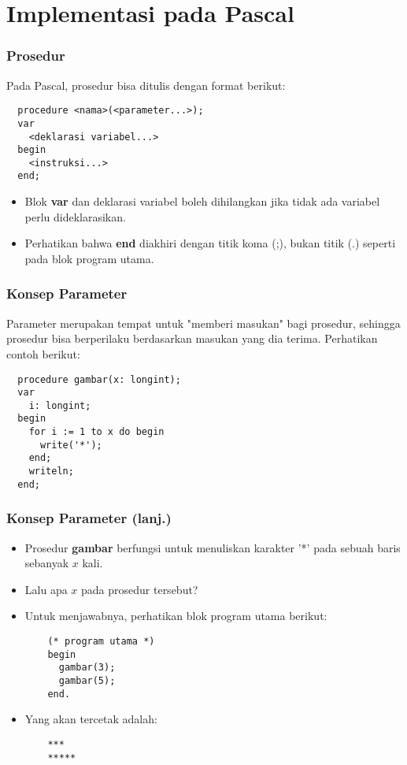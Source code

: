 \section{Implementasi pada Pascal}
\frame{\sectionpage}

\begin{frame}[fragile]
\frametitle{Prosedur}
Pada Pascal, prosedur bisa ditulis dengan format berikut:
\begin{lstlisting}
  procedure <nama>(<parameter...>);
  var
    <deklarasi variabel...>
  begin
    <instruksi...>
  end;
\end{lstlisting}
\begin{itemize}
  \item Blok \textbf{var} dan deklarasi variabel boleh dihilangkan jika tidak ada variabel perlu dideklarasikan.
  \item Perhatikan bahwa \textbf{end} diakhiri dengan titik koma (;), bukan titik (.) seperti pada blok program utama.
\end{itemize}
\end{frame}

\begin{frame}[fragile]
\frametitle{Konsep Parameter}
Parameter merupakan tempat untuk "memberi masukan" bagi prosedur, sehingga prosedur bisa berperilaku berdasarkan masukan yang dia terima.
\vfill
Perhatikan contoh berikut:
\begin{lstlisting}
  procedure gambar(x: longint);
  var
    i: longint;
  begin
    for i := 1 to x do begin
      write('*');
    end;
    writeln;
  end;
\end{lstlisting}
\end{frame}

\begin{frame}[fragile]
\frametitle{Konsep Parameter (lanj.)}
\begin{itemize}
  \item Prosedur \textbf{gambar} berfungsi untuk menuliskan karakter '*' pada sebuah baris sebanyak $x$ kali.
  \item Lalu apa $x$ pada prosedur tersebut?
  \item Untuk menjawabnya, perhatikan blok program utama berikut:
  \begin{lstlisting}
    (* program utama *)
    begin
      gambar(3);
      gambar(5);
    end.
  \end{lstlisting}
  \item Yang akan tercetak adalah:
  \begin{lstlisting}
    ***
    *****
  \end{lstlisting}
\end{itemize}
\end{frame}

